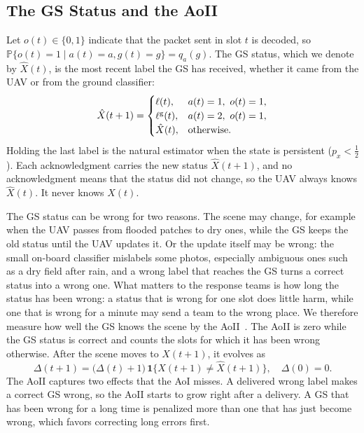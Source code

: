 \documentclass[5p,twocolumn]{elsarticle}
\theoremstyle{remark}
\newcommand{\Prob}{\mathbb{P}}
\newcommand{\ind}[1]{\mathbf{1}\{#1\}}
\newcommand{\lab}{\ell}
\begin{document}
\subsection{The GS Status and the AoII}
Let $o(t)\in\{0,1\}$ indicate that the packet sent in slot $t$ is decoded, so $\Prob\{o(t)=1\mid a(t)=a,g(t)=g\}=q_a(g)$. The GS status, which we denote by $\hat X(t)$, is the most recent label the GS has received, whether it came from the UAV or from the ground classifier:
\begin{equation}\label{eq:est}
\hat X(t+1)=\begin{cases}\lab(t), & a(t)=1,\ o(t)=1,\\ \lab^{\rm g}(t), & a(t)=2,\ o(t)=1,\\ \hat X(t), & \text{otherwise.}\end{cases}
\end{equation}
Holding the last label is the natural estimator when the state is persistent ($p_x<\frac12$). Each acknowledgment carries the new status $\hat X(t+1)$, and no acknowledgment means that the status did not change, so the UAV always knows $\hat X(t)$. It never knows $X(t)$.

The GS status can be wrong for two reasons. The scene may change, for example when the UAV passes from flooded patches to dry ones, while the GS keeps the old status until the UAV updates it. Or the update itself may be wrong: the small on-board classifier mislabels some photos, especially ambiguous ones such as a dry field after rain, and a wrong label that reaches the GS turns a correct status into a wrong one. What matters to the response teams is how long the status has been wrong: a status that is wrong for one slot does little harm, while one that is wrong for a minute may send a team to the wrong place. We therefore measure how well the GS knows the scene by the AoII~\cite{maatouk2020aoii}. The AoII is zero while the GS status is correct and counts the slots for which it has been wrong otherwise. After the scene moves to $X(t+1)$, it evolves as
\begin{equation}\label{eq:aoii}
\Delta(t+1)=\big(\Delta(t)+1\big)\,\ind{X(t+1)\neq\hat X(t+1)},\quad \Delta(0)=0.
\end{equation}
The AoII captures two effects that the AoI misses. A delivered wrong label makes a correct GS wrong, so the AoII starts to grow right after a delivery. A GS that has been wrong for a long time is penalized more than one that has just become wrong, which favors correcting long errors first.
\end{document}
